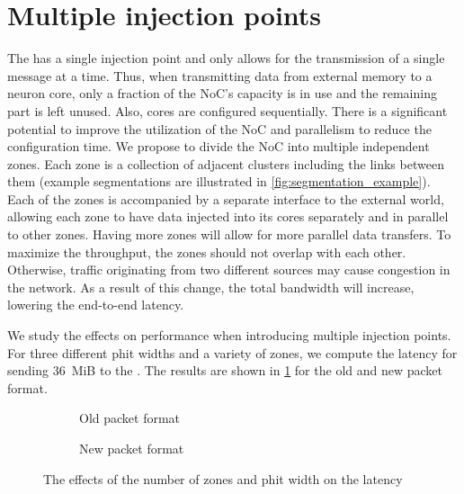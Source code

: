 \section{Multiple injection points}
The \confignoc{} has a single injection point and only allows for the transmission of a single message at a time.
Thus, when transmitting data from external memory to a neuron core, only a fraction of the NoC's capacity is in use and the remaining part  is left unused.
Also, cores are configured sequentially.
There is a significant potential to improve the utilization of the NoC and parallelism to reduce the configuration time.
We propose to divide the NoC into multiple independent zones.
Each zone is a collection of adjacent clusters including the links between them (example segmentations are illustrated in \cref{fig:segmentation_example}).
Each of the zones is accompanied by a separate interface to the external world, allowing each zone to have data injected into its cores separately and in parallel to other zones.
Having more zones will allow for more parallel data transfers.
To maximize the throughput, the zones should not overlap with each other.
Otherwise, traffic originating from two different sources may cause congestion in the network. 
As a result of this change, the total bandwidth will increase, lowering the end-to-end latency.

We study the effects on performance when introducing multiple injection points.
For three different phit widths and a variety of zones, we compute the latency for sending \SI{36}{MiB} to the \graicore{}.
The results are shown in \cref{fig:zones_vs_latency_vs_phit_width} for the old and new packet format.

\begin{figure}[htbp]
    \centering
    \begin{subfigure}[b]{0.48\textwidth}
        \begin{adjustbox}{width=\linewidth}
            
        \end{adjustbox}
        \caption{Old packet format}
    \end{subfigure}
    \hfill
    \begin{subfigure}[b]{0.48\textwidth}
        \begin{adjustbox}{width=\linewidth}
            
        \end{adjustbox}
        \caption{New packet format}
    \end{subfigure}
    \caption[]{The effects of the number of zones and phit width on the latency}
    \label{fig:zones_vs_latency_vs_phit_width}
\end{figure}



